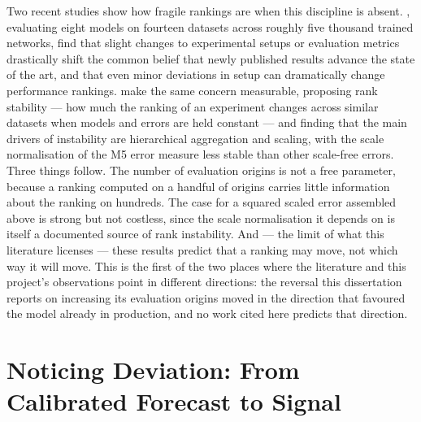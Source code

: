 Two recent studies show how fragile rankings are when this discipline is
absent. \citet{brigato_there_2025}, evaluating eight models on fourteen
datasets across roughly five thousand trained networks, find that slight
changes to experimental setups or evaluation metrics drastically shift the
common belief that newly published results advance the state of the art, and
that even minor deviations in setup can dramatically change performance
rankings. \citet{hewamalage_look_2021} make the same concern measurable,
proposing rank stability --- how much the ranking of an experiment changes
across similar datasets when models and errors are held constant --- and
finding that the main drivers of instability are hierarchical aggregation and
scaling, with the scale normalisation of the M5 error measure less stable than
other scale-free errors. Three things follow. The number of evaluation origins
is not a free parameter, because a ranking computed on a handful of origins
carries little information about the ranking on hundreds. The case for a
squared scaled error assembled above is strong but not costless, since the
scale normalisation it depends on is itself a documented source of rank
instability. And --- the limit of what this literature licenses --- these
results predict that a ranking may move, not which way it will move. This is
the first of the two places where the literature and this project's
observations point in different directions: the reversal this dissertation
reports on increasing its evaluation origins moved in the direction that
favoured the model already in production, and no work cited here predicts that
direction.

\section{Noticing Deviation: From Calibrated Forecast to Signal}
\label{sec:rw-deviation}

